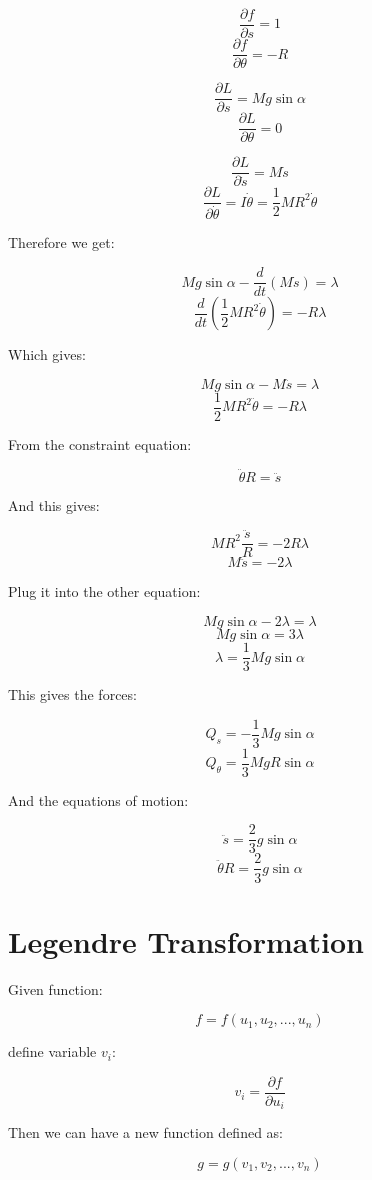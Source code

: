 \documentclass{article}
\begin{document}
$$\frac{ \partial f }{ \partial s } = 1$$
$$\frac{ \partial f }{ \partial \theta } = -R$$

$$\frac{ \partial L }{ \partial s } = Mg\sin{ \alpha }$$
$$\frac{ \partial L }{ \partial \theta } = 0$$

$$\frac{ \partial L }{ \partial \dot{ s } } = M\dot{ s }$$
$$\frac{ \partial L }{ \partial \dot{ \theta } } = I\dot{ \theta } = \frac{ 1 }{ 2 } MR^2 \dot{ \theta }$$

Therefore we get:

$$Mg\sin{ \alpha } - \frac{ d }{ dt }(M\dot{ s }) = \lambda$$
$$\frac{ d }{ dt }(\frac{ 1 }{ 2 } MR^2 \dot{ \theta }) = -R\lambda$$

Which gives:

$$Mg\sin{ \alpha } - M\ddot{ s } = \lambda$$
$$\frac{ 1 }{ 2 } MR^2 \ddot{ \theta } = -R\lambda$$

From the constraint equation:

$$\ddot{ \theta }R = \ddot{ s }$$

And this gives:

$$MR^2 \frac{ \ddot{ s } }{ R } = -2R\lambda$$
$$M \ddot{ s } = -2\lambda$$

Plug it into the other equation:

$$Mg\sin{ \alpha } - 2\lambda = \lambda$$
$$Mg\sin{ \alpha } = 3\lambda$$
$$\lambda = \frac{ 1 }{ 3 }Mg\sin{ \alpha }$$

This gives the forces:

$$Q_s = -\frac{ 1 }{ 3 }Mg\sin{ \alpha }$$
$$Q_\theta = \frac{ 1 }{ 3 }MgR\sin{ \alpha }$$

And the equations of motion:

$$\ddot{ s } = \frac{ 2 }{ 3 }g\sin{ \alpha }$$
$$\ddot{ \theta }R = \frac{ 2 }{ 3 }g\sin{ \alpha }$$





%
%
\newpage
\section{Legendre Transformation}

Given function:

$$f = f( u_1, u_2, ..., u_n )$$

define variable $v_i$:

$$v_i = \frac{ \partial f }{ \partial u_i }$$

Then we can have a new function defined as:

$$g = g( v_1, v_2, ..., v_n )$$
\end{document}
